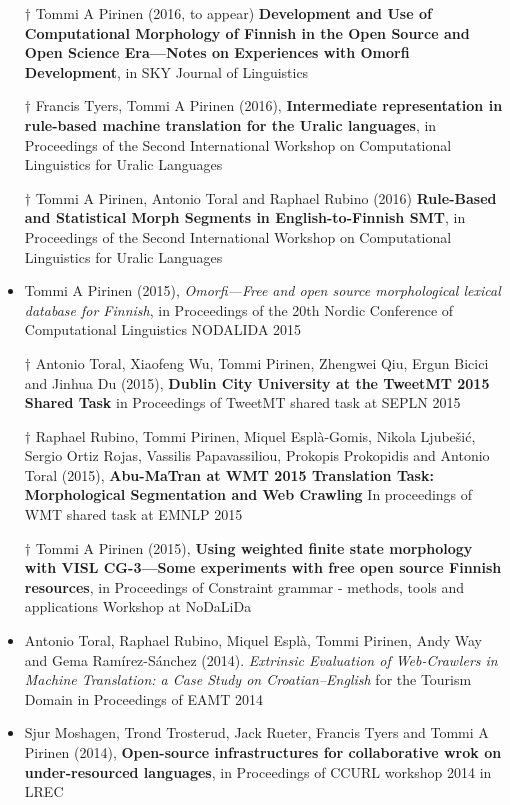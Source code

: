 \documentclass[a4paper]{article}
\begin{document}
\begin{itemize}
\item[$\dagger$] Tommi A Pirinen (2016, to appear) \textbf{Development and Use of Computational Morphology of Finnish in the Open Source and Open Science Era---Notes on Experiences with Omorfi Development}, in SKY Journal of Linguistics
\item[$\dagger$] Francis Tyers, Tommi A Pirinen (2016), \textbf{Intermediate representation in rule-based machine translation for the Uralic languages}, in  Proceedings of the Second International Workshop on Computational Linguistics for Uralic Languages
\item[$\dagger$] Tommi A Pirinen, Antonio Toral and Raphael Rubino (2016) \textbf{Rule-Based and Statistical Morph Segments in English-to-Finnish SMT}, in Proceedings of the Second International Workshop on Computational Linguistics for Uralic Languages
\item Tommi A Pirinen (2015), \textit{Omorfi—Free and open source morphological lexical database for Finnish}, in Proceedings of the 20th Nordic Conference of Computational Linguistics NODALIDA 2015
\item[$\dagger$] Antonio Toral, Xiaofeng Wu, Tommi Pirinen, Zhengwei Qiu, Ergun Bicici and Jinhua Du (2015), \textbf{Dublin City University at the TweetMT 2015 Shared Task} in Proceedings of TweetMT shared task at SEPLN 2015
\item[$\dagger$] Raphael Rubino, Tommi Pirinen, Miquel Esplà-Gomis, Nikola Ljubešić, Sergio Ortiz Rojas, Vassilis Papavassiliou, Prokopis Prokopidis and Antonio Toral (2015), \textbf{Abu-MaTran at WMT 2015 Translation Task: Morphological Segmentation and Web Crawling} In proceedings of WMT shared task at EMNLP 2015
\item[$\dagger$] Tommi A Pirinen (2015), \textbf{Using weighted finite state morphology with VISL CG-3—Some experiments with free open source Finnish resources}, in Proceedings of Constraint grammar - methods, tools and applications Workshop at NoDaLiDa
\item Antonio Toral, Raphael Rubino, Miquel Esplà, Tommi Pirinen, Andy Way and Gema Ramírez-Sánchez (2014). \textit{Extrinsic Evaluation of Web-Crawlers in Machine Translation: a Case Study on Croatian–English} for the Tourism Domain in Proceedings of EAMT 2014
\item Sjur Moshagen, Trond Trosterud, Jack Rueter, Francis Tyers and Tommi A Pirinen (2014), \textbf{Open-source infrastructures for collaborative wrok on under-resourced languages}, in Proceedings of CCURL workshop 2014 in LREC

\end{itemize}
\end{document}
